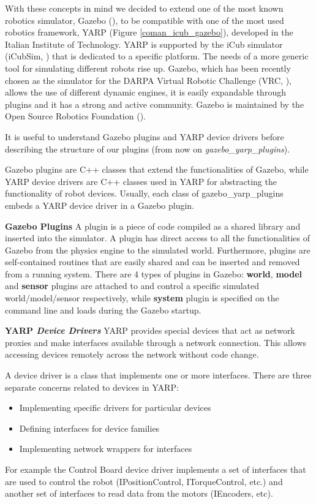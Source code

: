 With these concepts in mind we decided to extend one of the most known robotics simulator, Gazebo (\cite{koenig2004design}), to be compatible with one of the most used robotics framework, YARP (Figure \ref{coman_icub_gazebo}), developed in the Italian Institute of Technology. 
YARP is supported by the iCub simulator (iCubSim, \cite{Tikhanoff:2008:OSC:1774674.1774684}) that is dedicated to a specific platform. The needs of a more generic tool for simulating different robots rise up. 
Gazebo, which has been recently chosen as the simulator for the DARPA Virtual Robotic Challenge (VRC, \cite{DRC}), allows the use of different dynamic engines, it is easily expandable through plugins and it has a strong and active community. Gazebo is maintained by the Open Source Robotics Foundation (\cite{OSRF}).

\label{structure}
It is useful to understand Gazebo plugins and YARP device drivers before describing the structure of our plugins (from now on \emph{gazebo\_yarp\_plugins}).

Gazebo plugins are C++ classes that extend the functionalities of Gazebo, while YARP device drivers are C++ classes used in YARP for abstracting the functionality of robot devices.
Usually, each class of gazebo\_yarp\_plugins embeds a YARP device driver in a Gazebo plugin. 

{\bf Gazebo Plugins}
A plugin is a piece of code compiled as a shared library and inserted into the simulator. A plugin has direct access to all the functionalities of Gazebo from the physics engine to the simulated world. Furthermore, plugins are self-contained routines that are easily shared and can be inserted and removed from a running system. There are 4 types of plugins in Gazebo: \textbf{world}, \textbf{model} and \textbf{sensor} plugins are attached to and control a specific simulated world/model/sensor respectively, while \textbf{system} plugin is specified on the command line and loads during the Gazebo startup.


{\bf YARP \emph{Device Drivers}}
YARP provides special devices that act as network proxies and make interfaces available through a network connection. This allows accessing devices remotely across the network without code change.

A device driver is a class that implements one or more interfaces. There are three separate concerns related to devices in YARP:
\begin{itemize}
\item Implementing specific drivers for particular devices
\item Defining interfaces for device families
\item Implementing network wrappers for interfaces
\end{itemize}
For example the Control Board device driver implements a set of interfaces that are used to control the robot (IPositionControl, ITorqueControl, etc.) and another set of interfaces to read data from the motors (IEncoders, etc).

